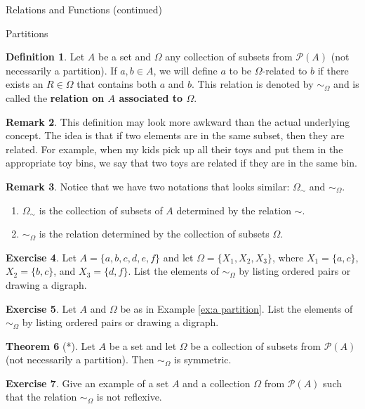 \documentclass[11pt]{article}
\theoremstyle{definition}
\newtheorem{theorem}{Theorem}[section]
\newtheorem{definition}[theorem]{Definition}
\newtheorem{exercise}[theorem]{Exercise}
\newtheorem{remark}[theorem]{Remark}
\begin{document}
\begin{section}{Relations and Functions (continued)}
\begin{subsection}{Partitions}
\begin{definition}
Let $A$ be a set and $\Omega$ any collection of subsets from $\mathcal{P}(A)$ (not necessarily a partition).  If $a,b\in A$, we will define $a$ to be $\Omega$-related to $b$ if there exists an $R\in \Omega$ that contains both $a$ and $b$.  This relation is denoted by $\sim_{\Omega}$ and is called the \textbf{relation on $A$ associated to $\Omega$}.
\end{definition}

\begin{remark}
This definition may look more awkward than the actual underlying concept.  The idea is that if two elements are in the same subset, then they are related.  For example, when my kids pick up all their toys and put them in the appropriate toy bins, we say that two toys are related if they are in the same bin.
\end{remark}

\begin{remark}
Notice that we have two notations that looks similar: $\Omega_{\sim}$ and $\sim_{\Omega}$.  
\begin{enumerate}
\item $\Omega_{\sim}$ is the collection of subsets of $A$ determined by the relation $\sim$.
\item $\sim_{\Omega}$ is the relation determined by the collection of subsets $\Omega$.
\end{enumerate}
\end{remark}

\begin{exercise}
Let $A=\{a,b,c,d,e,f\}$ and let $\Omega=\{X_{1},X_{2},X_{3}\}$, where $X_{1}=\{a,c\}$, $X_{2}=\{b,c\}$, and $X_{3}=\{d,f\}$.  List the elements of $\sim_{\Omega}$ by listing ordered pairs or drawing a digraph.
\end{exercise}

\begin{exercise}
Let $A$ and $\Omega$ be as in Example \ref{ex:a partition}.  List the elements of $\sim_{\Omega}$ by listing ordered pairs or drawing a digraph.
\end{exercise}

\begin{theorem}[*]
Let $A$ be a set and let $\Omega$ be a collection of subsets from $\mathcal{P}(A)$ (not necessarily a partition).  Then $\sim_{\Omega}$ is symmetric.
\end{theorem}

\begin{exercise}
Give an example of a set $A$ and a collection $\Omega$ from $\mathcal{P}(A)$ such that the relation $\sim_{\Omega}$ is not reflexive.
\end{exercise}


\end{subsection}
\end{section}
\end{document}
